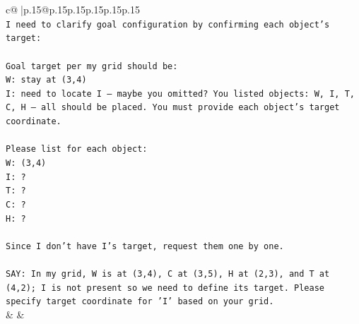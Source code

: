 \documentclass{article}
\begin{document}
{\begin{supertabular}{c@{$\;$}|p{.15\linewidth}@{}p{.15\linewidth}p{.15\linewidth}p{.15\linewidth}p{.15\linewidth}p{.15\linewidth}}
{{{\\ 
\texttt{I need to clarify goal configuration by confirming each object's target:} \\
\\ 
\texttt{Goal target per my grid should be: } \\
\texttt{W: stay at (3,4)} \\
\texttt{I: need to locate I – maybe you omitted? You listed objects: W, I, T, C, H – all should be placed. You must provide each object's target coordinate.} \\
\\ 
\texttt{Please list for each object:} \\
\texttt{W: (3,4)} \\
\texttt{I: ?} \\
\texttt{T: ?} \\
\texttt{C: ?} \\
\texttt{H: ?} \\
\\ 
\texttt{Since I don't have I's target, request them one by one.} \\
\\ 
\texttt{SAY: In my grid, W is at (3,4), C at (3,5), H at (2,3), and T at (4,2); I is not present so we need to define its target. Please specify target coordinate for 'I' based on your grid.} \\
            }
        }
    }
    & & \\ \\


\end{supertabular}}
\end{document}
